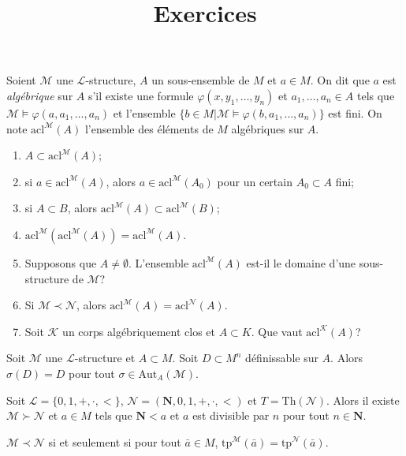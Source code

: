\documentclass[12pt,a4paper]{exprog}
\title{Exercices}
\renewcommand{\phi}{\varphi}
\begin{document}
\maketitle
\newcommand{\str}[1]{\mathcal{#1}}
\newcommand{\Ll}{\mathcal{L}}


\begin{question}
Soient $\str{M}$ une $\Ll$-structure, $A$ un sous-ensemble de $M$ et $a\in M$. On
dit que $a$ est \emph{algébrique} sur $A$ s'il existe une formule
$\phi(x,y_{1},\ldots,y_{n})$ et $a_{1},\ldots,a_{n}\in A$ tels que
$\str{M}\models\phi(a,a_{1},\ldots,a_{n})$ et l'ensemble $\{b\in
M|\str{M}\models\phi(b,a_{1},\ldots,a_{n})\}$ est fini. On note $\text{acl}^{\str{M}}(A)$
l'ensemble des éléments de $M$ algébriques sur $A$.
\begin{enumerate}
  \item $A\subset\text{acl}^{\str{M}}(A)$;
  \item si $a\in\text{acl}^{\str{M}}(A)$, alors
    $a\in\text{acl}^{\str{M}}(A_{0})$ pour
    un certain $A_{0}\subset A$ fini;
  \item si $A\subset B$, alors $\text{acl}^{\str{M}}(A)\subset\text{acl}^{\str{M}}(B)$;
  \item  $\text{acl}^{\str{M}}(\text{acl}^{\str{M}}(A))=\text{acl}^{\str{M}}(A)$.
  \item Supposons que $A\neq\emptyset$. L'ensemble $\text{acl}^{\str{M}}(A)$ est-il le
    domaine d'une sous-structure de $\str{M}$?
  \item Si $\str{M}\prec\str{N}$, alors
    $\text{acl}^{\str{M}}(A)=\text{acl}^{\str{N}}(A)$.
  \item Soit $\str{K}$ un corps algébriquement clos et $A\subset K$. Que vaut $\text{acl}^{\str{K}}(A)$?
\end{enumerate}
\end{question}
\begin{question}
  Soit $\str{M}$ une $\Ll$-structure et $A\subset M$. Soit $D\subset M^{n}$
  définissable sur $A$. Alors $\sigma(D)=D$ pour tout $\sigma\in\text{Aut}_{A}(\str{M})$.
\end{question}
\begin{question}
  Soit $\Ll=\{0,1,+,\cdot,<\}$, $\str{N}=(\mathbf{N},0,1,+,\cdot,<)$ et
  $T=\text{Th}(\str{N})$. Alors il existe $\str{M}\succ\str{N}$ et $a\in M$ tels que
  $\mathbf{N}<a$ et $a$ est divisible par $n$ pour tout $n\in\mathbf{N}$.
\end{question}
\begin{question}
  $\str{M}\prec\str{N}$ si et seulement si pour tout $\bar{a}\in M$, $\text{tp}^{\str{M}}(\bar{a})=\text{tp}^{\str{N}}(\bar{a})$.
\end{question}
\end{document}

